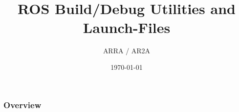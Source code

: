 \documentclass{beamer}
\title[]{ROS Build/Debug Utilities and Launch-Files} %
\author{ARRA / AR2A} %
\institute %
{
\textbf{A}dvancements for \textbf{R}obotics in \textbf{R}escue \textbf{A}pplications
}
\date{\today} %
\begin{document}
\begin{frame}
\titlepage %
\end{frame}
\begin{frame}
\frametitle{Overview} %
\tableofcontents %
\end{frame}
\end{document}
